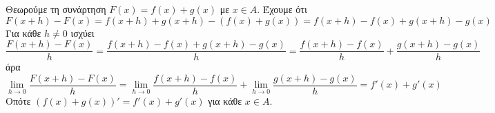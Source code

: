 Θεωρούμε τη συνάρτηση $ F(x)=f(x)+g(x) $ με $ x\in A $. Έχουμε ότι
\[ F(x+h)-F(x)=f(x+h)+g(x+h)-(f(x)+g(x))=f(x+h)-f(x)+g(x+h)-g(x) \]
Για κάθε $ h\neq 0 $ ισχύει
\[ \frac{F(x+h)-F(x)}{h}=\frac{f(x+h)-f(x)+g(x+h)-g(x)}{h}=\frac{f(x+h)-f(x)}{h}+\frac{g(x+h)-g(x)}{h} \]
άρα
\[ \lim_{h\to 0}\frac{F(x+h)-F(x)}{h}=\lim_{h\to 0}\frac{f(x+h)-f(x)}{h}+\lim_{h\to 0}\frac{g(x+h)-g(x)}{h}=f'(x)+g'(x) \]
Οπότε $ (f(x)+g(x))'=f'(x)+g'(x) $ για κάθε $ x\in A $.
